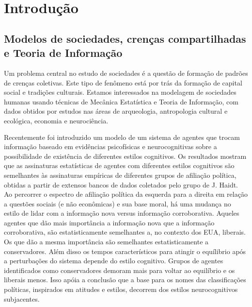 \documentclass[12pt]{article}
\begin{document}
\setcounter{page}{3}
\doublespace
\section{Introdução}
\subsection{Modelos de sociedades, crenças compartilhadas
 e Teoria de Informação}
Um problema central no estudo de sociedades é a questão de formação
de padrões de crenças coletivas. Este tipo de fenômeno está por trás da
formação de capital social e tradições culturais.
Estamos interessados na modelagem de sociedades humanas
usando técnicas de Mecânica Estatística e Teoria de Informação, com dados  
obtidos por estudos nas áreas de arqueologia, antropologia cultural 
e ecológica, economia e neurociência.  



Recentemente foi introduzido \cite{CaVi} um modelo de um sistema de 
agentes que trocam informação baseado em evidências psicofísicas 
e neurocognitivas sobre a possibilidade de existência de diferentes
estilos cognitivos. Os resultados mostram que as assinaturas estatísticas
de agentes com diferentes estilos cognitivos são semelhantes às
assinaturas empíricas de diferentes grupos de afiliação política, 
obtidas a partir de
extensos bancos de dados coletados pelo grupo de J. Haidt. 
Ao percorrer o espectro
de afiliação política da esquerda para a direita em relação a questões
sociais (e não econômicas) e sua base moral, há uma mudança
no estilo de lidar com a informação nova versus informação corroborativa.
Aqueles agentes que dão mais importância a informação nova que a
informação corroborativa, são estatisticamente semelhantes a, no contexto
dos EUA, liberais. Os que dão a mesma importância são semelhantes 
estatisticamente a conservadores. Além disso os tempos característicos para
atingir o equílibrio após a perturbações do sistema depende do estilo 
cognitivo. Grupos de agentes identificados como conservadores demoram mais
para voltar ao equilíbrio e os liberais menos. Isso apóia a conclusão 
que a base para os nomes das classificações políticas, inspirados em
atitudes e estilos, decorrem dos estilos neurocognitivos
subjacentes. 
\end{document}
